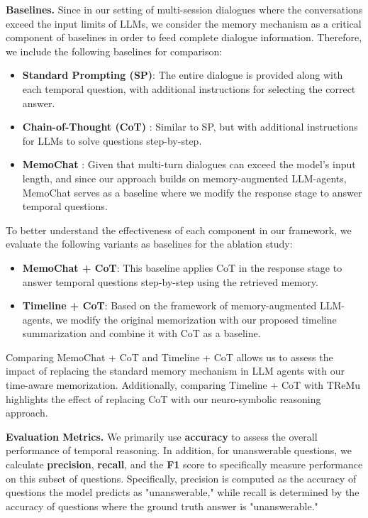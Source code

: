 \noindent\textbf{Baselines.}
Since in our setting of multi-session dialogues where the conversations exceed the input limits of LLMs, we consider the memory mechanism as a critical component of baselines in order to feed complete dialogue information. Therefore, we include the following baselines for comparison:



\begin{itemize} 
    \item \textbf{Standard Prompting (SP)}: The entire dialogue is provided along with each temporal question, with additional instructions for selecting the correct answer.

    \item \textbf{Chain-of-Thought (CoT)} \cite{wei2022chain}: Similar to SP, but with additional instructions for LLMs to solve questions step-by-step.

    \item \textbf{MemoChat} \cite{lu2023memochat}: Given that multi-turn dialogues can exceed the model's input length, and since our approach builds on memory-augmented LLM-agents, MemoChat serves as a baseline where we modify the response stage to answer temporal questions.
\end{itemize}

To better understand the effectiveness of each component in our framework, we evaluate the following variants as baselines for the ablation study:
\begin{itemize}
    \item \textbf{MemoChat + CoT}: This baseline applies CoT in the response stage to answer temporal questions step-by-step using the retrieved memory.

    \item \textbf{Timeline + CoT}: Based on the framework of memory-augmented LLM-agents, we modify the original memorization with our proposed timeline summarization and combine it with CoT as a baseline.
\end{itemize}

Comparing MemoChat + CoT and Timeline + CoT allows us to assess the impact of replacing the standard memory mechanism in LLM agents with our time-aware memorization. Additionally, comparing Timeline + CoT with TReMu highlights the effect of replacing CoT with our neuro-symbolic reasoning approach.

\noindent\textbf{Evaluation Metrics.}
We primarily use \textbf{accuracy} to assess the overall performance of temporal reasoning. In addition, for unanswerable questions, we calculate \textbf{precision}, \textbf{recall}, and the \textbf{F1} score to specifically measure performance on this subset of questions. Specifically, precision is computed as the accuracy of questions the model predicts as "unanswerable," while recall is determined by the accuracy of questions where the ground truth answer is "unanswerable."


